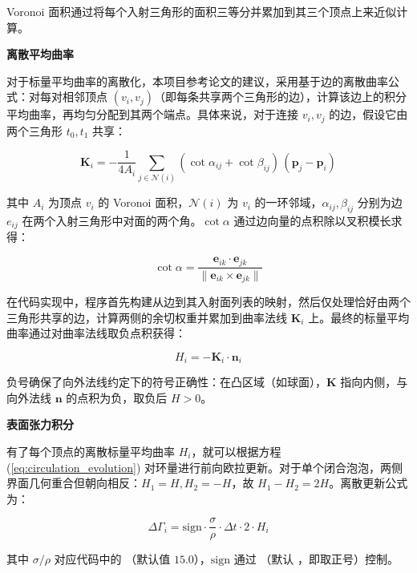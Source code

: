 Voronoi 面积通过将每个入射三角形的面积三等分并累加到其三个顶点上来近似计算。

\textbf{离散平均曲率}

对于标量平均曲率的离散化，本项目参考论文的建议，采用基于边的离散曲率公式：对每对相邻顶点 $(v_i, v_j)$（即每条共享两个三角形的边），计算该边上的积分平均曲率，再均匀分配到其两个端点。具体来说，对于连接 $v_i, v_j$ 的边，假设它由两个三角形 $t_0, t_1$ 共享：

\begin{equation}
\mathbf{K}_i = -\frac{1}{4A_i} \sum_{j \in \mathcal{N}(i)} (\cot\alpha_{ij} + \cot\beta_{ij})\,(\mathbf{p}_j - \mathbf{p}_i)
\label{eq:cotan_curvature}
\end{equation}

其中 $A_i$ 为顶点 $v_i$ 的 Voronoi 面积，$\mathcal{N}(i)$ 为 $v_i$ 的一环邻域，$\alpha_{ij}, \beta_{ij}$ 分别为边 $e_{ij}$ 在两个入射三角形中对面的两个角。$\cot\alpha$ 通过边向量的点积除以叉积模长求得：

\begin{equation}
\cot\alpha = \frac{\mathbf{e}_{ik} \cdot \mathbf{e}_{jk}}{\|\mathbf{e}_{ik} \times \mathbf{e}_{jk}\|}
\label{eq:cotan}
\end{equation}

在代码实现中，程序首先构建从边到其入射面列表的映射，然后仅处理恰好由两个三角形共享的边，计算两侧的余切权重并累加到曲率法线 $\mathbf{K}_i$ 上。最终的标量平均曲率通过对曲率法线取负点积获得：

\begin{equation}
H_i = -\mathbf{K}_i \cdot \mathbf{n}_i
\label{eq:scalar_H}
\end{equation}

负号确保了向外法线约定下的符号正确性：在凸区域（如球面），$\mathbf{K}$ 指向内侧，与向外法线 $\mathbf{n}$ 的点积为负，取负后 $H > 0$。

\textbf{表面张力积分}

有了每个顶点的离散标量平均曲率 $H_i$，就可以根据方程 (\ref{eq:circulation_evolution}) 对环量进行前向欧拉更新。对于单个闭合泡泡，两侧界面几何重合但朝向相反：$H_1 = H, H_2 = -H$，故 $H_1 - H_2 = 2H$。离散更新公式为：

\begin{equation}
\Delta\Gamma_i = \text{sign} \cdot \frac{\sigma}{\rho} \cdot \Delta t \cdot 2 \cdot H_i
\label{eq:discrete_dGamma}
\end{equation}

其中 $\sigma/\rho$ 对应代码中的 （默认值 $15.0$），$\text{sign}$ 通过 （默认 ，即取正号）控制。

